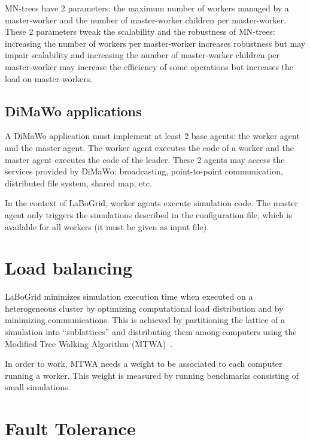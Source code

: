 MN-trees have 2 parameters: the maximum number of workers managed by a
master-worker and the number of master-worker children per master-worker.
These 2 parameters tweak the scalability and the robustness of MN-trees:
increasing the number of workers per master-worker increases robustness but may
impair scalability and increasing the number of master-worker children per
master-worker may increase the efficiency of some operations but increases the
load on master-workers.


\subsection{DiMaWo applications}
\label{sec_arch_dimawo_apps}

A DiMaWo application must implement at least 2 base agents: the worker agent and
the master agent. The worker agent executes the code of a worker and the master
agent executes the code of the leader. These 2 agents may access the services
provided by DiMaWo: broadcasting, point-to-point communication, distributed
file system, shared map, etc.

In the context of LaBoGrid, worker agents execute simulation code. The master
agent only triggers the simulations described in the configuration file, which
is available for all workers (it must be given as input file).


\section{Load balancing}
\label{sec_arch_load}

LaBoGrid minimizes simulation execution time when executed on a heterogeneous
cluster by optimizing computational load distribution and by minimizing
communications. This is achieved by partitioning the lattice of a simulation
into ``sublattices'' and distributing them among computers using the Modified
Tree Walking Algorithm (MTWA)~\cite{Dethier11}.

In order to work, MTWA needs a weight to be associated to each computer
running a worker. This weight is measured by running benchmarks consisting of
small simulations. 


\section{Fault Tolerance}
\label{sec_arch_fault}

